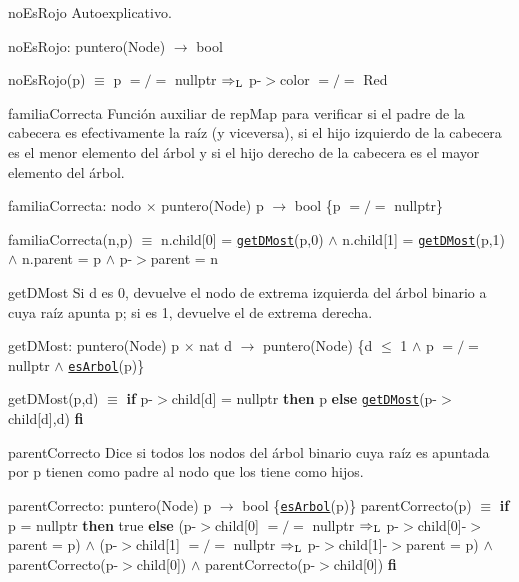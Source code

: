 \begin{DoxyParagraph}{no\-Es\-Rojo}
Autoexplicativo.

no\-Es\-Rojo\-: puntero(\-Node) $\to$ bool \par
 no\-Es\-Rojo(p) $\equiv$ p $=/=$ nullptr $\Rightarrow_{\rm L}$ p-\/$>$color $=/=$ Red


\end{DoxyParagraph}
\begin{DoxyParagraph}{familia\-Correcta}
Función auxiliar de rep\-Map para verificar si el padre de la cabecera es efectivamente la raíz (y viceversa), si el hijo izquierdo de la cabecera es el menor elemento del árbol y si el hijo derecho de la cabecera es el mayor elemento del árbol.

familia\-Correcta\-: nodo $\times$ puntero(\-Node) p $\to$ bool \{p $=/=$ nullptr\} \par
 familia\-Correcta(n,p) $\equiv$ n.\-child\mbox{[}0\mbox{]} = \href{axiomas.html#getDMost}{\tt get\-D\-Most}(p,0) $\land$ n.\-child\mbox{[}1\mbox{]} = \href{axiomas.html#getDMost}{\tt get\-D\-Most}(p,1) $\land$ n.\-parent = p $\land$ p-\/$>$parent = n


\end{DoxyParagraph}
\begin{DoxyParagraph}{get\-D\-Most}
Si d es 0, devuelve el nodo de extrema izquierda del árbol binario a cuya raíz apunta p; si es 1, devuelve el de extrema derecha.

get\-D\-Most\-: puntero(\-Node) p $\times$ nat d $\to$ puntero(\-Node) \{d $\leq$ 1 $\land$ p $=/=$ nullptr $\land$ \href{axiomas.html#esArbol}{\tt es\-Arbol}(p)\} \par
 get\-D\-Most(p,d) $\equiv$ {\bfseries if} p-\/$>$child\mbox{[}d\mbox{]} = nullptr {\bfseries then} p {\bfseries else} \href{axiomas.html#getDMost}{\tt get\-D\-Most}(p-\/$>$child\mbox{[}d\mbox{]},d) {\bfseries fi} 


\end{DoxyParagraph}
\begin{DoxyParagraph}{parent\-Correcto}
Dice si todos los nodos del árbol binario cuya raíz es apuntada por p tienen como padre al nodo que los tiene como hijos.

parent\-Correcto\-: puntero(\-Node) p $\to$ bool \{\href{axiomas.html#esArbol}{\tt es\-Arbol}(p)\} parent\-Correcto(p) $\equiv$ {\bfseries if} p = nullptr {\bfseries then} true {\bfseries else} (p-\/$>$child\mbox{[}0\mbox{]} $=/=$ nullptr $\Rightarrow_{\rm L}$ p-\/$>$child\mbox{[}0\mbox{]}-\/$>$parent = p) $\land$ (p-\/$>$child\mbox{[}1\mbox{]} $=/=$ nullptr $\Rightarrow_{\rm L}$ p-\/$>$child\mbox{[}1\mbox{]}-\/$>$parent = p) $\land$ parent\-Correcto(p-\/$>$child\mbox{[}0\mbox{]}) $\land$ parent\-Correcto(p-\/$>$child\mbox{[}0\mbox{]}) {\bfseries fi} 


\end{DoxyParagraph}
